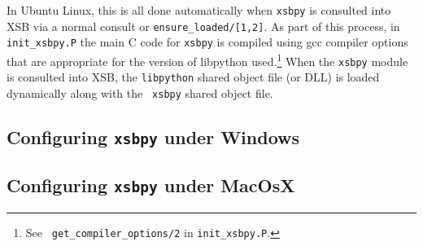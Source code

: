 In Ubuntu Linux, this is all done automatically when {\tt xsbpy} is
consulted into XSB via a normal consult or {\tt ensure\_loaded/[1,2]}.
As part of this process, in {\tt init\_xsbpy.P} the main C code for
{\tt xsbpy} is compiled using gcc compiler options that are
appropriate for the version of libpython used.\footnote{See {\tt
    get\_compiler\_options/2} in {\tt init\_xsbpy.P}.}
When the {\tt xsbpy} module is consulted into XSB, the {\tt libpython}
shared object file (or DLL) is loaded dynamically along with the {\tt
  xsbpy} shared object file.

%
%


\noindent

\subsection{Configuring {\tt xsbpy} under Windows}

\subsection{Configuring {\tt xsbpy} under MacOsX}

